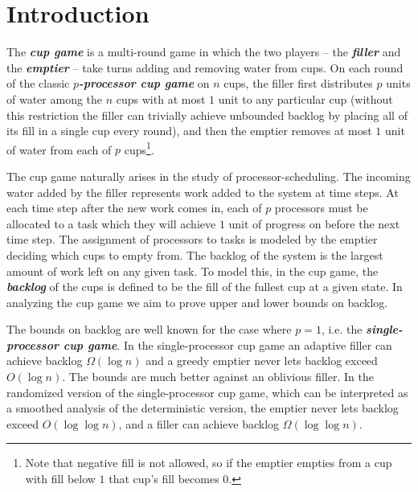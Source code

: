 \documentclass[twocolumn]{article}[10pt]
\newcommand{\defn}[1]{{\textit{\textbf{\boldmath #1}}}\xspace}
\renewcommand{\paragraph}[1]{\vspace{0.09in}\noindent{\bf \boldmath #1.}}
\begin{document}
\section{Introduction}\label{sec:intro}
\paragraph{Definition and Motivation}
The \defn{cup game} is a multi-round game in which the two players -- the
\defn{filler} and the \defn{emptier} -- take turns adding and removing water
from cups. On each round of the classic \defn{$p$-processor cup game} on $n$
cups, the filler first distributes $p$ units of water among
the $n$ cups with at most $1$ unit to any particular cup (without this
restriction the filler can trivially achieve unbounded backlog by placing all
of its fill in a single cup every round), and then the emptier 
removes at most $1$ unit of water from each of $p$ cups\footnote{Note that negative
fill is not allowed, so if the emptier empties from a cup with fill below $1$
that cup's fill becomes $0$.}.

The cup game naturally arises in the study of processor-scheduling.
The incoming water added by the filler represents work added to the system at
time steps. At each time step after the new work comes in, each of $p$
processors must be allocated to a task which they will achieve $1$ unit of
progress on before the next time step. The assignment of processors to tasks is
modeled by the emptier deciding which cups to empty from. The backlog of
the system is the largest amount of work left on any given task. To model this,
in the cup game, the \defn{backlog} of the cups is defined to be the fill of
the fullest cup at a given state. 
In analyzing the cup game we aim to prove upper and lower bounds on backlog.

\paragraph{Previous Work}
The bounds on backlog are well known for the case where $p=1$, i.e. the
\defn{single-processor cup game}.
In the single-processor cup game an adaptive filler can achieve backlog
$\Omega(\log n)$ and a greedy emptier never lets backlog exceed $O(\log n)$.
The bounds are much better against an oblivious filler.
In the randomized version of the single-processor cup game, which can be
interpreted as a smoothed analysis of the deterministic version, the emptier
never lets backlog exceed $O(\log \log n)$, and a filler can achieve backlog
$\Omega(\log\log n)$.
\end{document}
